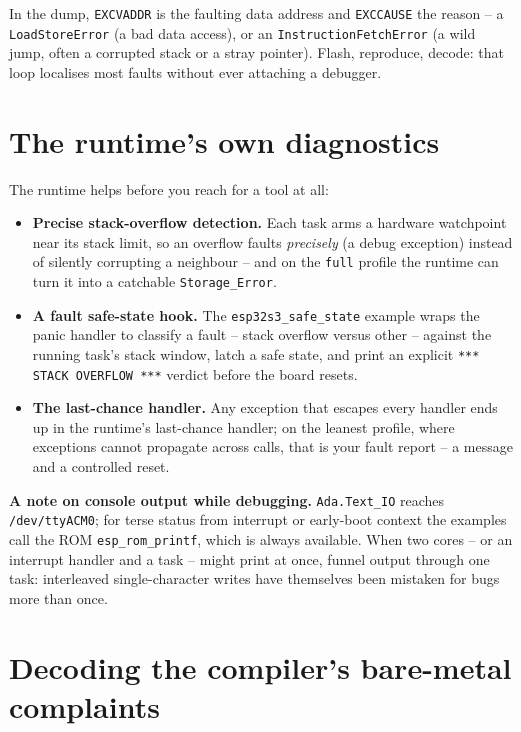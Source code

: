 In the dump, \texttt{EXCVADDR} is the faulting data address and \texttt{EXCCAUSE}
the reason -- a \texttt{LoadStoreError} (a bad data access), or an
\texttt{InstructionFetchError} (a wild jump, often a corrupted stack or a stray
pointer). Flash, reproduce, decode: that loop localises most faults without ever
attaching a debugger.

\section{The runtime's own diagnostics}

The runtime helps before you reach for a tool at all:

\begin{itemize}
  \item \textbf{Precise stack-overflow detection.} Each task arms a hardware
        watchpoint near its stack limit, so an overflow faults \emph{precisely}
        (a debug exception) instead of silently corrupting a neighbour -- and on
        the \texttt{full} profile the runtime can turn it into a catchable
        \texttt{Storage\_Error}.
  \item \textbf{A fault safe-state hook.} The \texttt{esp32s3\_safe\_state}
        example wraps the panic handler to classify a fault -- stack overflow
        versus other -- against the running task's stack window, latch a safe
        state, and print an explicit \texttt{*** STACK OVERFLOW ***} verdict
        before the board resets.
  \item \textbf{The last-chance handler.} Any exception that escapes every handler
        ends up in the runtime's last-chance handler; on the leanest profile,
        where exceptions cannot propagate across calls, that is your fault report
        -- a message and a controlled reset.
\end{itemize}

\textbf{A note on console output while debugging.} \texttt{Ada.Text\_IO} reaches
\texttt{/dev/ttyACM0}; for terse status from interrupt or early-boot context the
examples call the ROM \texttt{esp\_rom\_printf}, which is always available. When
two cores -- or an interrupt handler and a task -- might print at once, funnel
output through one task: interleaved single-character writes have themselves been
mistaken for bugs more than once.

\section{Decoding the compiler's bare-metal complaints}

